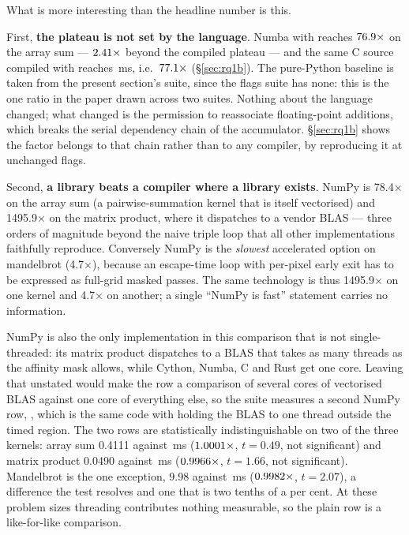 What is more interesting than the headline number is this.

First, \textbf{the plateau is not set by the language}. Numba with  reaches
$\meas{ratio:b1_compute-314:arraysum/cpython_loop|b1_compute-314:arraysum/numba_fastmath}{76.9}\times$ on the array sum --- $\meas{ratio:b1_compute-314:arraysum/numba|b1_compute-314:arraysum/numba_fastmath}{2.41}\times$ beyond the compiled plateau --- and the same C
source compiled with  reaches \,ms, i.e.\ $\meas{ratio:b1_compute-314:arraysum/cpython_loop|b1_flags-314:arraysum/O3native_ffast}{77.1}\times$
(\S\ref{sec:rq1b}). The pure-Python baseline is taken from the present section's suite, since the
flags suite has none: this is the one ratio in the paper drawn across two suites. Nothing about the language changed; what changed is the permission to
reassociate floating-point additions, which breaks the serial dependency chain of the
accumulator. \S\ref{sec:rq1b} shows the factor belongs to that chain rather than to any
compiler, by reproducing it at unchanged flags.

Second, \textbf{a library beats a compiler where a library exists}. NumPy is 78.4$\times$ on
the array sum (a pairwise-summation kernel that is itself vectorised) and 1495.9$\times$ on the
matrix product, where it dispatches to a vendor BLAS --- three orders of magnitude beyond
the naive triple loop that all other implementations faithfully reproduce. Conversely NumPy
is the \emph{slowest} accelerated option on mandelbrot (4.7$\times$), because an escape-time
loop with per-pixel early exit has to be expressed as full-grid masked passes. The
same technology is thus 1495.9$\times$ on one kernel and 4.7$\times$ on another; a single
``NumPy is fast'' statement carries no information.

NumPy is also the only implementation in this comparison that is not single-threaded: its
matrix product dispatches to a BLAS that takes as many threads as the affinity mask allows,
while Cython, Numba, C and Rust get one core. Leaving that unstated would make the row a
comparison of several cores of vectorised BLAS against one core of everything else, so the
suite measures a second NumPy row, , which is the same code with
 holding the BLAS to one thread outside the timed region. The two rows are
statistically indistinguishable on two of the three kernels: array sum 0.4111 against \,ms
($\meas{ratio:b1_compute-314:arraysum/numpy_1t|b1_compute-314:arraysum/numpy}{1.0001}\times$, $t=0.49$, not significant) and matrix product 0.0490 against \,ms
($\meas{ratio:b1_compute-314:matmul/numpy_1t|b1_compute-314:matmul/numpy}{0.9966}\times$, $t=1.66$, not significant). Mandelbrot is the one exception, 9.98 against
\,ms ($\meas{ratio:b1_compute-314:mandelbrot/numpy_1t|b1_compute-314:mandelbrot/numpy}{0.9982}\times$, $t=2.07$), a difference the test resolves and one that is two tenths of a
per cent. At these problem sizes threading contributes nothing measurable, so
the plain  row is a like-for-like comparison.

